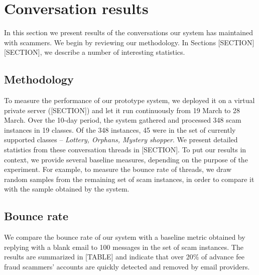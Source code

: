 \section{Conversation results}
In this section we present results of the conversations our system has maintained with scammers. We begin by reviewing our methodology. In Sections [SECTION][SECTION], we describe a number of interesting statistics.
\subsection{Methodology}
To measure the performance of our prototype system, we deployed it on a virtual private server ([SECTION]) and let it run continuously from 19 March to 28 March. Over the 10-day period, the system gathered and processed 348 scam instances in 19 classes. Of the 348 instances, 45 were in the set of currently supported classes -- \textit{Lottery, Orphans, Mystery shopper}. We present detailed statistics from these conversation threads in [SECTION]. To put our results in context, we provide several baseline measures, depending on the purpose of the experiment. For example, to measure the bounce rate of threads, we draw random samples from the remaining set of scam instances, in order to compare it with the sample obtained by the system.

\begin{center}
\end{center}

\subsection{Bounce rate}
We compare the bounce rate of our system with a baseline metric obtained by replying with a blank email to 100 messages in the set of scam instances. The results are summarized in [TABLE] and indicate that over 20\% of advance fee fraud scammers' accounts are quickly detected and removed by email providers.

